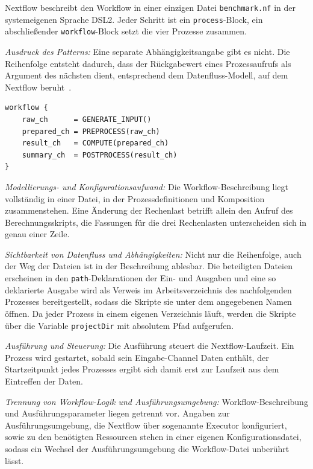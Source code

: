 Nextflow beschreibt den Workflow in einer einzigen Datei
\texttt{benchmark.nf} in der systemeigenen Sprache DSL2. Jeder Schritt
ist ein \texttt{process}-Block, ein abschließender
\texttt{workflow}-Block setzt die vier Prozesse zusammen.

\emph{Ausdruck des Patterns:} Eine separate Abhängigkeitsangabe gibt
es nicht. Die Reihenfolge entsteht dadurch, dass der Rückgabewert
eines Prozessaufrufs als Argument des nächsten dient, entsprechend
dem Datenfluss-Modell, auf dem Nextflow
beruht~\cite[S.~317]{ditommaso2017nextflow}.

\begin{lstlisting}[caption={workflow-Block aus benchmark.nf (Nextflow, Pipeline)},label={lst:pipe:nf}]
workflow {
    raw_ch      = GENERATE_INPUT()
    prepared_ch = PREPROCESS(raw_ch)
    result_ch   = COMPUTE(prepared_ch)
    summary_ch  = POSTPROCESS(result_ch)
}
\end{lstlisting}

\emph{Modellierungs- und Konfigurationsaufwand:} Die
Workflow-Beschreibung liegt vollständig in einer Datei, in der
Prozessdefinitionen und Komposition zusammenstehen. Eine Änderung der
Rechenlast betrifft allein den Aufruf des Berechnungsskripts, die
Fassungen für die drei Rechenlasten unterscheiden sich in genau einer
Zeile.

\emph{Sichtbarkeit von Datenfluss und Abhängigkeiten:} Nicht nur die
Reihenfolge, auch der Weg der Dateien ist in der Beschreibung
ablesbar. Die beteiligten Dateien erscheinen in den
\texttt{path}-Deklarationen der Ein- und Ausgaben und eine so
deklarierte Ausgabe wird als Verweis im Arbeitsverzeichnis des
nachfolgenden Prozesses bereitgestellt, sodass die Skripte sie unter
dem angegebenen Namen öffnen. Da jeder Prozess in einem eigenen
Verzeichnis läuft, werden die Skripte über die Variable
\texttt{projectDir} mit absolutem Pfad aufgerufen.

\emph{Ausführung und Steuerung:} Die Ausführung steuert die
Nextflow-Laufzeit. Ein Prozess wird gestartet, sobald sein
Eingabe-Channel Daten enthält, der Startzeitpunkt jedes Prozesses ergibt sich damit erst zur Laufzeit aus dem Eintreffen der Daten.

\emph{Trennung von Workflow-Logik und Ausführungsumgebung:}
Workflow-Beschreibung und Ausführungsparameter liegen getrennt vor.
Angaben zur Ausführungsumgebung, die Nextflow über sogenannte
Executor konfiguriert, sowie zu den benötigten Ressourcen stehen in
einer eigenen Konfigurationsdatei, sodass ein Wechsel der
Ausführungsumgebung die Workflow-Datei unberührt lässt.


